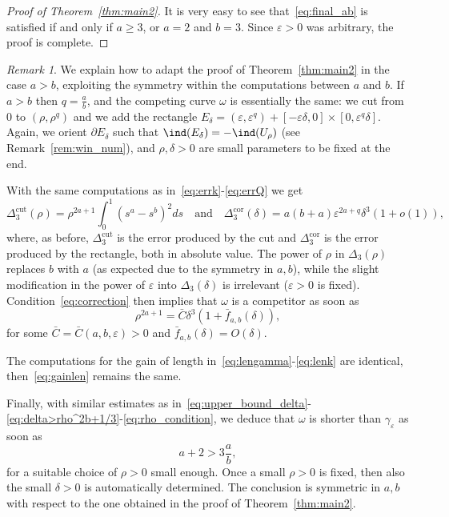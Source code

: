 \documentclass[12pt]{amsart}
\theoremstyle{plain}
\theoremstyle{definition}
\theoremstyle{remark}
\newtheorem{remark}[theorem]{Remark}
\numberwithin{equation}{section}
\newcommand{\<}{\langle}
\renewcommand{\>}{\rangle}
\newcommand{\e}{\varepsilon}
\newcommand{\0}{\theta}
\newcommand{\w}{\omega}
\renewcommand{\d}{\partial}
\newcommand{\g}{\gamma}
\newcommand{\de}{\delta}
\newcommand{\De}{\Delta}
\newcommand{\1}{{-1}}
\newcommand{\cut}{\mathrm{cut}}
\newcommand{\cor}{\mathrm{cor}}
\renewcommand{\=}{\coloneqq}
\renewcommand{\.}{\dots}
\renewcommand{\-}{\cdot}
\renewcommand{\:}{\,:\,}
\newcommand{\mr}{\mathrm}
\theoremstyle{definition}
\begin{document}
\begin{proof}[Proof of Theorem~\ref{thm:main2}]
	It is very easy to see that~\eqref{eq:final_ab} is satisfied if and only if $a\geq3$, or $a=2$ and $b=3$. Since $\e>0$ was arbitrary, the proof is complete.
\end{proof}


\begin{remark}
	\label{rem:a>b}
	We explain how to adapt the proof of Theorem~\ref{thm:main2} in the case $a>b$, exploiting the symmetry within the computations between $a$ and $b$. If $a>b$ then $q=\frac ab$, and the competing curve $\w$ is essentially the same: we cut from 0 to $(\rho,\rho^{q})$ and we add the rectangle $E_\de=(\e,\e^{q})+[-\e\de,0]\times[0,\e^{q}\de]$. Again, we orient $\d E_\de$ such that $\ind(E_\de)=-\ind(U_\rho)$ (see Remark~\ref{rem:win_num}), and $\rho,\de>0$ are small parameters to be fixed at the end. 
	
	With the same computations as in~\eqref{eq:errk}-\eqref{eq:errQ} we get
	\begin{equation}
		\De_3^{\cut}(\rho)=\rho^{2a+1}\int_{0}^{1} (s^a-s^b)^2ds \quad \mr{and} \quad  \De_3^{\cor}(\de)=a(b+a)\e^{2a+q}\de^3(1+o(1)),
	\end{equation}
	where, as before, $\De_3^\cut$ is the error produced by the cut and $\De_3^{\cor}$ is the error produced by the rectangle, both in absolute value. The power of $\rho$ in $\De_3(\rho)$ replaces $b$ with $a$ (as expected due to the symmetry in $a,b$), while the slight modification in the power of $\e$ into $\De_3(\de)$ is irrelevant ($\e>0$ is fixed). Condition~\eqref{eq:correction} then implies that $\w$ is a competitor as soon as
	\begin{equation}
		\label{eq:correction'}
		\rho^{2a+1}=\bar C\de^3(1+\bar f_{a,b}(\de)),
	\end{equation}
	for some $\bar C=\bar C(a,b,\e)>0$ and $\bar f_{a,b}(\de)=O(\de)$.
	
	The computations for the gain of length in~\eqref{eq:lengamma}-\eqref{eq:lenk} are identical, then~\eqref{eq:gainlen} remains the same.

	Finally, with similar estimates as in~\eqref{eq:upper_bound_delta}-\eqref{eq:delta>rho^2b+1/3}-\eqref{eq:rho_condition}, we deduce that $\w$ is shorter than $\g_\e$ as soon as
	\begin{equation}
		\label{eq:final_ba}
		a+2>3\frac ab,
	\end{equation}
	for a suitable choice of $\rho>0$ small enough. Once a small $\rho>0$ is fixed, then also the small $\de>0$ is automatically determined. The conclusion is symmetric in $a,b$ with respect to the one obtained in the proof of Theorem~\ref{thm:main2}.
\end{remark}
\end{document}
